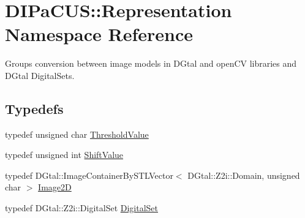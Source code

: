 \hypertarget{namespaceDIPaCUS_1_1Representation}{}\section{D\+I\+Pa\+C\+US\+:\+:Representation Namespace Reference}
\label{namespaceDIPaCUS_1_1Representation}


Groups conversion between image models in D\+Gtal and open\+CV libraries and D\+Gtal Digital\+Sets.  


\subsection*{Typedefs}
\begin{DoxyCompactItemize}
\item 
typedef unsigned char \mbox{\hyperlink{namespaceDIPaCUS_1_1Representation_a85996f90f0c4186ddae15b4f372bf875}{Threshold\+Value}}
\item 
typedef unsigned int \mbox{\hyperlink{namespaceDIPaCUS_1_1Representation_a66bd167c31ee02704986500ddb462df8}{Shift\+Value}}
\item 
typedef D\+Gtal\+::\+Image\+Container\+By\+S\+T\+L\+Vector$<$ D\+Gtal\+::\+Z2i\+::\+Domain, unsigned char $>$ \mbox{\hyperlink{namespaceDIPaCUS_1_1Representation_ae97917e89f57298fda1626daad9f1733}{Image2D}}
\item 
typedef D\+Gtal\+::\+Z2i\+::\+Digital\+Set \mbox{\hyperlink{namespaceDIPaCUS_1_1Representation_a6eca0b4fa262f2d600f11d82ee10b5a6}{Digital\+Set}}
\end{DoxyCompactItemize}
